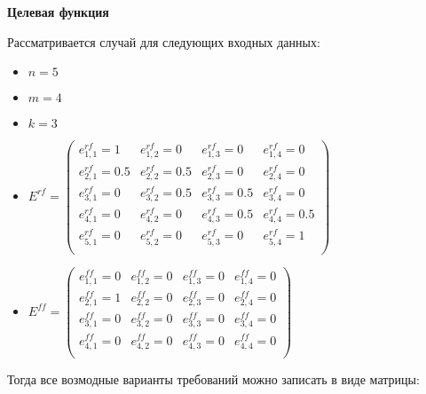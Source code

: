 \documentclass{article}
\begin{document}
  \textbf{Целевая функция}

  Рассматривается случай для следующих входных данных:
  \begin{itemize}
    \item[] $n = 5$
    \item[] $m = 4$
    \item[] $k = 3$
    \item[] $
      E^{rf} = 
      \begin{pmatrix}
         e^{rf}_{1, 1} = 1  &  e^{rf}_{1, 2} = 0  &  e^{rf}_{1, 3} = 0  &  e^{rf}_{1, 4} = 0  \\ %
        e^{rf}_{2, 1} = 0.5 & e^{rf}_{2, 2} = 0.5 &  e^{rf}_{2, 3} = 0  &  e^{rf}_{2, 4} = 0  \\ %
         e^{rf}_{3, 1} = 0  & e^{rf}_{3, 2} = 0.5 & e^{rf}_{3, 3} = 0.5 &  e^{rf}_{3, 4} = 0  \\ %
         e^{rf}_{4, 1} = 0  &  e^{rf}_{4, 2} = 0  & e^{rf}_{4, 3} = 0.5 & e^{rf}_{4, 4} = 0.5 \\ %
         e^{rf}_{5, 1} = 0  &  e^{rf}_{5, 2} = 0  &  e^{rf}_{5, 3} = 0  &  e^{rf}_{5, 4} = 1  \\ %
      \end{pmatrix}
          $
    \item[] $
      E^{ff} =
      \begin{pmatrix}
        e^{ff}_{1, 1} = 0 & e^{ff}_{1, 2} = 0 & e^{ff}_{1, 3} = 0 & e^{ff}_{1, 4} = 0 \\
        e^{ff}_{2, 1} = 1 & e^{ff}_{2, 2} = 0 & e^{ff}_{2, 3} = 0 & e^{ff}_{2, 4} = 0 \\ %
        e^{ff}_{3, 1} = 0 & e^{ff}_{3, 2} = 0 & e^{ff}_{3, 3} = 0 & e^{ff}_{3, 4} = 0 \\
        e^{ff}_{4, 1} = 0 & e^{ff}_{4, 2} = 0 & e^{ff}_{4, 3} = 0 & e^{ff}_{4, 4} = 0 \\
      \end{pmatrix}
            $
  \end{itemize}

  Тогда все возмодные варианты требований можно записать в виде матрицы:
\end{document}
